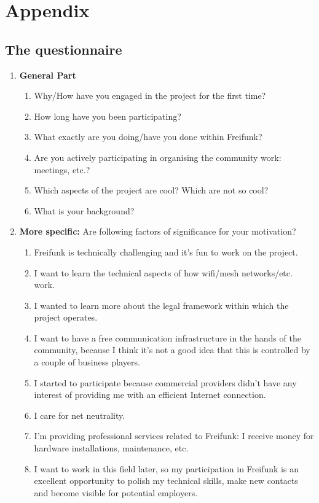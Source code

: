 \section{Appendix}

\subsection{The questionnaire}

\begin{enumerate}[label*=\arabic*.]
  \item \textbf{General Part}
 \begin{enumerate}[label*=\arabic*.]
   \item Why/How have you engaged in the project for the first time?
   \item How long have you been participating?
   \item What exactly are you doing/have you done within Freifunk?
   \item Are you actively participating in organising the community work: meetings, etc.?
   \item Which aspects of the project are cool? Which are not so cool?
   \item What is your background?
 \end{enumerate}

\item \textbf{More specific:} Are following factors of significance for your motivation?
\begin{enumerate}[label*=\arabic*.]
  \item Freifunk is technically challenging and it's fun to work on the project.
  \item I want to learn the technical aspects of how wifi/mesh networks/etc. work.
  \item I wanted to learn more about the legal framework within which the project operates.
  \item I want to have a free communication infrastructure in the hands of the community, because I think it's not a good idea that this is controlled by a couple of business players.
  \item I started to participate because commercial providers didn't have any interest of providing me with an efficient Internet connection.
  \item I care for net neutrality.
  \item I'm providing professional services related to Freifunk: I receive money for hardware installations, maintenance, etc.
  \item I want to work in this field later, so my participation in Freifunk is an excellent opportunity to polish my technical skills, make new contacts and become visible for potential employers.
\end{enumerate}

\end{enumerate}

